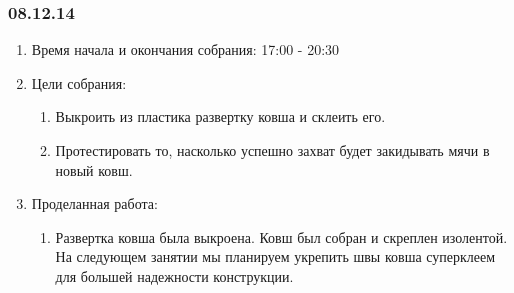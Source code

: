 \subsubsection{08.12.14}

\begin{enumerate}
	\item Время начала и окончания собрания:
	17:00 - 20:30
	\item Цели собрания:
	\begin{enumerate}
	  \item Выкроить из пластика развертку ковша и склеить его.
	  
	  \item Протестировать то, насколько успешно захват будет закидывать мячи в новый ковш.
	  
    \end{enumerate}
	\item Проделанная работа:
	\begin{enumerate}
	  \item Развертка ковша была выкроена. Ковш был собран и скреплен изолентой. На следующем занятии мы планируем укрепить швы ковша суперклеем для большей надежности конструкции.
	  

\end{enumerate}
\end{enumerate}
